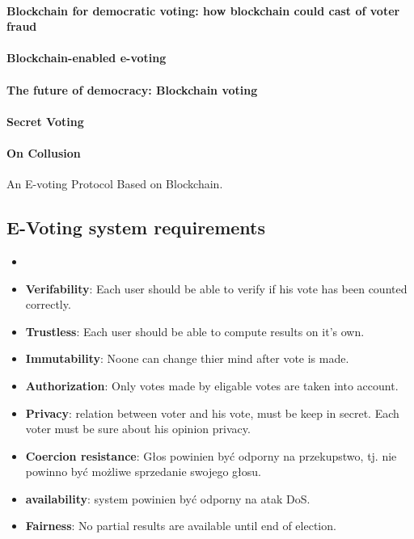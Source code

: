 \documentclass[runningheads]{llncs}
\begin{document}
\paragraph{Blockchain for democratic voting: how blockchain could cast of 
voter fraud ~\cite{casado2018blockchain} }

\paragraph{Blockchain-enabled e-voting ~\cite{kshetri2018blockchain} }

\paragraph{The future of democracy: Blockchain voting ~\cite{osgood2016future} }

\paragraph{Secret Voting ~\cite{tam_2018} }

\paragraph{On Collusion ~\cite{buterin_2019} }
An E-voting Protocol Based on Blockchain. ~\cite{liu2017voting} 


\subsection{E-Voting system requirements}
\begin{itemize}
    \item 

\item \textbf{Verifability}: Each user should be able to verify if his vote has been counted correctly.
\item \textbf{Trustless}: Each user should be able to compute results on it's own.
\item \textbf{Immutability}: Noone can change thier mind after vote is made.

\item \textbf{Authorization}: Only votes made by eligable votes are taken into account.

\item \textbf{Privacy}: relation between voter and his vote, must be keep in secret. Each voter must be sure about his opinion privacy. 

\item \textbf{Coercion resistance}: Głos powinien być odporny na przekupstwo, tj. nie powinno być możliwe sprzedanie swojego głosu.
\item \textbf{availability}: system powinien być odporny na atak DoS.
\item \textbf{Fairness}: No partial results are available until end of election.
\end{itemize}
\end{document}
